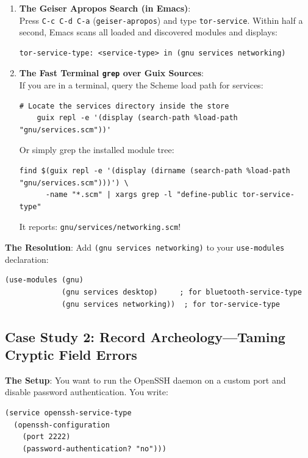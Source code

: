 \begin{enumerate}
  \item \textbf{The Geiser Apropos Search (in Emacs)}:\\
    Press \texttt{C-c C-d C-a} (\texttt{geiser-apropos}) and type \texttt{tor-service}. Within half a second, Emacs scans all loaded and discovered modules and displays:
    \begin{lstlisting}[style=guixscheme]
    tor-service-type: <service-type> in (gnu services networking)
    \end{lstlisting}

  \item \textbf{The Fast Terminal \texttt{grep} over Guix Sources}:\\
    If you are in a terminal, query the Scheme load path for services:
    \begin{lstlisting}[style=guixcli]
    # Locate the services directory inside the store
    guix repl -e '(display (search-path %load-path "gnu/services.scm"))'
    \end{lstlisting}
    Or simply grep the installed module tree:
    \begin{lstlisting}[style=guixcli]
    find $(guix repl -e '(display (dirname (search-path %load-path "gnu/services.scm")))') \
      -name "*.scm" | xargs grep -l "define-public tor-service-type"
    \end{lstlisting}
    It reports: \texttt{gnu/services/networking.scm}!
\end{enumerate}

\textbf{The Resolution}: Add \texttt{(gnu services networking)} to your \texttt{use-modules} declaration:
\begin{lstlisting}[style=guixscheme]
(use-modules (gnu)
             (gnu services desktop)     ; for bluetooth-service-type
             (gnu services networking))  ; for tor-service-type
\end{lstlisting}

\subsection{Case Study 2: Record Archeology---Taming Cryptic Field Errors}

\textbf{The Setup}: You want to run the OpenSSH daemon on a custom port and disable password authentication. You write:

\begin{lstlisting}[style=guixscheme]
(service openssh-service-type
  (openssh-configuration
    (port 2222)
    (password-authentication? "no")))
\end{lstlisting}


